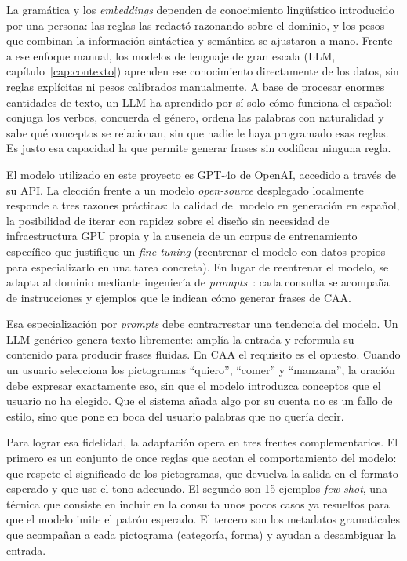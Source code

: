 La gramática y los \textit{embeddings} dependen de conocimiento lingüístico introducido por una persona: las reglas las redactó razonando sobre el dominio, y los pesos que combinan la información sintáctica y semántica se ajustaron a mano. Frente a ese enfoque manual, los modelos de lenguaje de gran escala (LLM, capítulo~\ref{cap:contexto}) aprenden ese conocimiento directamente de los datos, sin reglas explícitas ni pesos calibrados manualmente. A base de procesar enormes cantidades de texto, un LLM ha aprendido por sí solo cómo funciona el español: conjuga los verbos, concuerda el género, ordena las palabras con naturalidad y sabe qué conceptos se relacionan, sin que nadie le haya programado esas reglas. Es justo esa capacidad la que permite generar frases sin codificar ninguna regla.

El modelo utilizado en este proyecto es GPT-4o de OpenAI, accedido a través de su API. La elección frente a un modelo \textit{open-source} desplegado localmente responde a tres razones prácticas: la calidad del modelo en generación en español, la posibilidad de iterar con rapidez sobre el diseño sin necesidad de infraestructura GPU propia y la ausencia de un corpus de entrenamiento específico que justifique un \textit{fine-tuning} (reentrenar el modelo con datos propios para especializarlo en una tarea concreta). En lugar de reentrenar el modelo, se adapta al dominio mediante ingeniería de \textit{prompts}~\cite{brown2020language}: cada consulta se acompaña de instrucciones y ejemplos que le indican cómo generar frases de CAA.

Esa especialización por \textit{prompts} debe contrarrestar una tendencia del modelo. Un LLM genérico genera texto libremente: amplía la entrada y reformula su contenido para producir frases fluidas. En CAA el requisito es el opuesto. Cuando un usuario selecciona los pictogramas ``quiero'', ``comer'' y ``manzana'', la oración debe expresar exactamente eso, sin que el modelo introduzca conceptos que el usuario no ha elegido. Que el sistema añada algo por su cuenta no es un fallo de estilo, sino que pone en boca del usuario palabras que no quería decir.

Para lograr esa fidelidad, la adaptación opera en tres frentes complementarios. El primero es un conjunto de once reglas que acotan el comportamiento del modelo: que respete el significado de los pictogramas, que devuelva la salida en el formato esperado y que use el tono adecuado. El segundo son 15 ejemplos \textit{few-shot}, una técnica que consiste en incluir en la consulta unos pocos casos ya resueltos para que el modelo imite el patrón esperado. El tercero son los metadatos gramaticales que acompañan a cada pictograma (categoría, forma) y ayudan a desambiguar la entrada.

